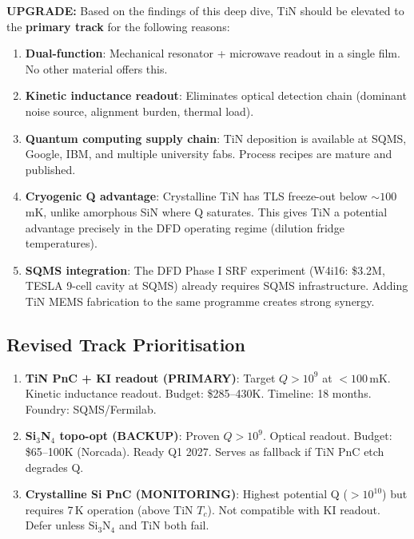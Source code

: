 \documentclass[11pt]{article}
\theoremstyle{remark}
\newcommand{\upgrade}[1]{\textcolor{blue!70!black}{\textbf{UPGRADE:} #1}}
\begin{document}
\upgrade{Based on the findings of this deep dive, TiN should be elevated
to the \textbf{primary track} for the following reasons:}
\begin{enumerate}[nosep]
  \item \textbf{Dual-function}: Mechanical resonator + microwave readout
    in a single film. No other material offers this.
  \item \textbf{Kinetic inductance readout}: Eliminates optical detection
    chain (dominant noise source, alignment burden, thermal load).
  \item \textbf{Quantum computing supply chain}: TiN deposition is
    available at SQMS, Google, IBM, and multiple university fabs.
    Process recipes are mature and published.
  \item \textbf{Cryogenic Q advantage}: Crystalline TiN has TLS
    freeze-out below $\sim 100$\,mK, unlike amorphous SiN where Q
    saturates. This gives TiN a potential advantage precisely in the
    DFD operating regime (dilution fridge temperatures).
  \item \textbf{SQMS integration}: The DFD Phase I SRF experiment
    (W4i16: \$3.2M, TESLA 9-cell cavity at SQMS) already requires
    SQMS infrastructure. Adding TiN MEMS fabrication to the same
    programme creates strong synergy.
\end{enumerate}

\subsection{Revised Track Prioritisation}

\begin{tcolorbox}[colback=teal!5!white, colframe=teal!50!black,
  title=\textbf{Revised MEMS Track Priorities (W4i17)}]
\begin{enumerate}
  \item \textbf{TiN PnC + KI readout (PRIMARY)}: Target $Q > 10^9$ at
    $< 100$\,mK. Kinetic inductance readout. Budget: \$285--430K.
    Timeline: 18 months. Foundry: SQMS/Fermilab.
  \item \textbf{Si$_3$N$_4$ topo-opt (BACKUP)}: Proven $Q > 10^9$.
    Optical readout. Budget: \$65--100K (Norcada). Ready Q1 2027.
    Serves as fallback if TiN PnC etch degrades Q.
  \item \textbf{Crystalline Si PnC (MONITORING)}: Highest potential Q
    ($> 10^{10}$) but requires 7\,K operation (above TiN $T_c$).
    Not compatible with KI readout. Defer unless Si$_3$N$_4$ and TiN
    both fail.
\end{enumerate}
\end{tcolorbox}
\end{document}
